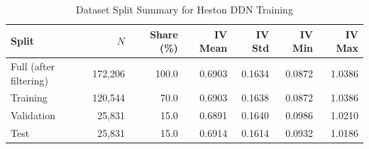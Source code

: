 \begin{table}[htbp]
\centering
\caption{Dataset Split Summary for Heston DDN Training}
\label{tab:dataset_split}
\begin{tabular}{lrrrrrr}
\toprule
Split & $N$ & Share (\%) & IV Mean & IV Std & IV Min & IV Max \\
\midrule
Full (after filtering) & 172,206 & 100.0 & 0.6903 & 0.1634 & 0.0872 & 1.0386 \\
Training & 120,544 & 70.0 & 0.6903 & 0.1638 & 0.0872 & 1.0386 \\
Validation & 25,831 & 15.0 & 0.6891 & 0.1640 & 0.0986 & 1.0210 \\
Test & 25,831 & 15.0 & 0.6914 & 0.1614 & 0.0932 & 1.0186 \\
\bottomrule
\end{tabular}
\end{table}